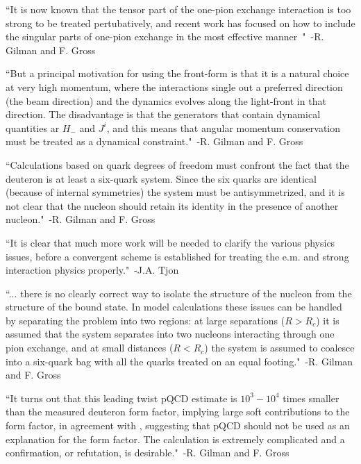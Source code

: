 ``It is now known that the tensor part of the one-pion exchange interaction is too strong to be treated pertubatively, and recent work has focused on how to include the singular parts of one-pion exchange in the most effective manner~\cite{Phillips:1999hh,Phillips:1999am,Walzl:2001vb}"~-R. Gilman and F. Gross~\cite{Gilman:2001yh}

``But a principal motivation for using the front-form is that it is a natural choice at very high momentum, where the interactions single out a preferred direction (the beam direction) and the dynamics evolves along the light-front in that direction. The disadvantage is that the generators that contain dynamical quantities ar $H_{-}$ and $J^i$, and this means that angular momentum conservation must be treated as a dynamical constraint."~-R. Gilman and F. Gross~\cite{Gilman:2001yh}

``Calculations based on quark degrees of freedom must confront the fact that the deuteron is at least a six-quark system. Since the six quarks are identical (because of internal symmetries) the system must be antisymmetrized, and it is not clear that the nucleon should retain its identity in the presence of another nucleon."~-R. Gilman and F. Gross~\cite{Gilman:2001yh}

``It is clear that much more work will be needed to clarify the various physics issues, before a convergent scheme is established for treating the e.m. and strong interaction physics properly."~-J.A. Tjon~\cite{Tjon.48218}

``... there is no clearly correct way to isolate the structure of the nucleon from the structure of the bound state. In model calculations these issues can be handled by separating the problem into two regions: at large separations ($R>R_c$) it is assumed that the system separates into two nucleons interacting through one pion exchange, and at small distances ($R<R_c$) the system is assumed to coalesce into a six-quark bag with all the quarks treated on an equal footing."~-R. Gilman and F. Gross~\cite{Gilman:2001yh}

``It turns out that this leading twist pQCD estimate is $10^3-10^4$ times smaller than the measured deuteron form factor, implying large soft contributions to the form factor, in agreement with \cite{Isgur:1988iw,Radyushkin:1990te}, suggesting that pQCD should not be used as an explanation for the form factor. The calculation is extremely complicated and a confirmation, or refutation, is desirable."~-R. Gilman and F. Gross~\cite{Gilman:2001yh}


